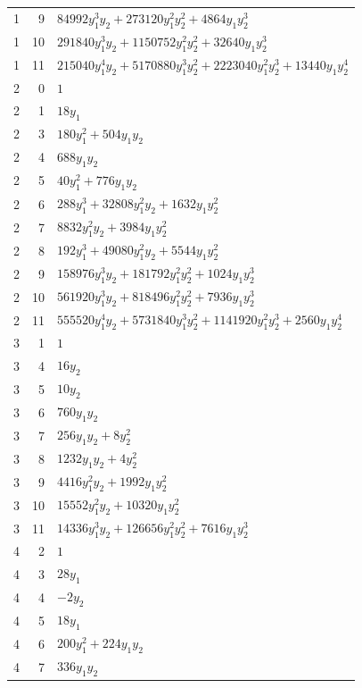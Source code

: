 \documentclass[10pt,a4paper]{article}
\begin{document}
{\begin{longtable}{rrp{125mm}}
1 & 9 & $84992 y_{1}^{3} y_{2} + 273120 y_{1}^{2} y_{2}^{2} + 4864 y_{1} y_{2}^{3}$\\
1 & 10 & $291840 y_{1}^{3} y_{2} + 1150752 y_{1}^{2} y_{2}^{2} + 32640 y_{1} y_{2}^{3}$\\
1 & 11 & $215040 y_{1}^{4} y_{2} + 5170880 y_{1}^{3} y_{2}^{2} + 2223040 y_{1}^{2} y_{2}^{3} + 13440 y_{1} y_{2}^{4}$\\
2 & 0 & $1$\\
2 & 1 & $18 y_{1}$\\
2 & 3 & $180 y_{1}^{2} + 504 y_{1} y_{2}$\\
2 & 4 & $688 y_{1} y_{2}$\\
2 & 5 & $40 y_{1}^{2} + 776 y_{1} y_{2}$\\
2 & 6 & $288 y_{1}^{3} + 32808 y_{1}^{2} y_{2} + 1632 y_{1} y_{2}^{2}$\\
2 & 7 & $8832 y_{1}^{2} y_{2} + 3984 y_{1} y_{2}^{2}$\\
2 & 8 & $192 y_{1}^{3} + 49080 y_{1}^{2} y_{2} + 5544 y_{1} y_{2}^{2}$\\
2 & 9 & $158976 y_{1}^{3} y_{2} + 181792 y_{1}^{2} y_{2}^{2} + 1024 y_{1} y_{2}^{3}$\\
2 & 10 & $561920 y_{1}^{3} y_{2} + 818496 y_{1}^{2} y_{2}^{2} + 7936 y_{1} y_{2}^{3}$\\
2 & 11 & $555520 y_{1}^{4} y_{2} + 5731840 y_{1}^{3} y_{2}^{2} + 1141920 y_{1}^{2} y_{2}^{3} + 2560 y_{1} y_{2}^{4}$\\
3 & 1 & $1$\\
3 & 4 & $16 y_{2}$\\
3 & 5 & $10 y_{2}$\\
3 & 6 & $760 y_{1} y_{2}$\\
3 & 7 & $256 y_{1} y_{2} + 8 y_{2}^{2}$\\
3 & 8 & $1232 y_{1} y_{2} + 4 y_{2}^{2}$\\
3 & 9 & $4416 y_{1}^{2} y_{2} + 1992 y_{1} y_{2}^{2}$\\
3 & 10 & $15552 y_{1}^{2} y_{2} + 10320 y_{1} y_{2}^{2}$\\
3 & 11 & $14336 y_{1}^{3} y_{2} + 126656 y_{1}^{2} y_{2}^{2} + 7616 y_{1} y_{2}^{3}$\\
4 & 2 & $1$\\
4 & 3 & $28 y_{1}$\\
4 & 4 & $- 2 y_{2}$\\
4 & 5 & $18 y_{1}$\\
4 & 6 & $200 y_{1}^{2} + 224 y_{1} y_{2}$\\
4 & 7 & $336 y_{1} y_{2}$\\

\end{longtable}}
\end{document}
